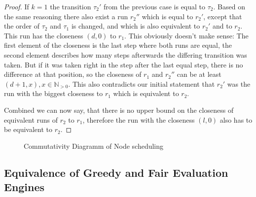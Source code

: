 \begin{proof}
If \(k = 1\) the transition \(\tau_2'\) from the previous case is equal to \(\tau_2\).
Based on the same reasoning there also exist a run \(r_2''\) which is equal to \(r_2'\), except that the order of \(\tau_2\) and \(\tau_1\) is changed, and which is also equivalent to \(r_2'\) and to \(r_2\).
This run has the closeness \((d, 0)\) to \(r_1\).
This obviously doesn't make sense: The first element of the closeness is the last step where both runs are equal, the second element describes how many steps afterwards the differing transition was taken.
But if it was taken right in the step after the last equal step, there is no difference at that position, so the closeness of \(r_1\) and \(r_2''\) can be at least \((d+1, x), x \in \mathbb{N}_{>0}\).
This also contradicts our initial statement that \(r_2'\) was the run with the biggest closeness to \(r_1\) which is equivalent to \(r_2\).

Combined we can now say, that there is no upper bound on the closeness of equivalent runs of \(r_2\) to \(r_1\), therefore the run with the closeness \((l, 0)\) also has to be equivalent to \(r_2\).

\end{proof}


\begin{figure}
  \caption{Commutativity Diagramm of Node scheduling}
\label{fig:chap5:sec_greedy:commutativity_scheduling}
\end{figure}



\subsection{Equivalence of Greedy and Fair Evaluation Engines}
\label{sec:behaviours:equivalence_without_timing:greedy_fair}

